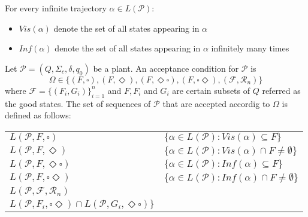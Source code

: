 \documentclass[table]{beamer}
\newcommand{\Plant}{\ensuremath{\mathcal{P}=(Q,\Sigma_c,\delta, q_0)}}
\newcommand{\AccpCond}{\ensuremath{\{(F,\square),(F,\Diamond ),(F,\Diamond\square),(F,\square\Diamond),(\mathcal{F},\mathcal{R}_n)\}}}
\begin{document}
\begin{frame}
	For every infinite trajectory $\alpha \in L(\mathcal{P})$:
	\begin{itemize}
		\item $Vis(\alpha)$ denote the set of all states appearing in $\alpha$
		\item $Inf(\alpha)$ denote the set of all states appearing in $\alpha$ infinitely many times
	\end{itemize}
\end{frame}

\begin{frame}
	\begin{dfn}
		Let $\Plant$ be a plant. An acceptance condition for $\mathcal{P}$ is
		$$ \Omega \in \AccpCond$$
		where $\mathcal{F} = \{(F_i,G_i)\}^{n}_{i=1}$ and $F, F_i$ and $G_i$ 
		are certain subsets of $Q$ referred as the good states. The set of sequences of $\mathcal{P}$ that are accepted
		accordig to $\Omega$ is defined as follows:
	\end{dfn}
	\begin{adjustwidth}{-1cm}{-1cm}
	\begin{table}[]
		\begin{tabular}{ll}
		\hline
		\rowcolor{azzurro_chiaro}
		$L(\mathcal{P},F,\square)$ & $\{\alpha \in L(\mathcal{P}):Vis(\alpha)\subseteq F\}$ \\ 
		$L(\mathcal{P},F,\Diamond)$ & $\{\alpha \in L(\mathcal{P}):Vis(\alpha)\cap F \neq \emptyset\}$ \\ 
		\rowcolor{azzurro_chiaro}
		$L(\mathcal{P},F,\Diamond\square)$ & $\{\alpha \in L(\mathcal{P}):Inf(\alpha)\subseteq F\}$ \\ 
		$L(\mathcal{P},F,\square\Diamond)$ & $\{\alpha \in L(\mathcal{P}):Inf(\alpha)\cap F \neq \emptyset\}$\\ 
		\rowcolor{azzurro_chiaro}
		$L(\mathcal{P},\mathcal{F},\mathcal{R}_n)$ & \shortstack{
			$\{\alpha \in L(\mathcal{P}): \exists i \alpha \in$ \\
			$L(\mathcal{P},F_i,\square\Diamond) \cap L(\mathcal{P},G_i,\Diamond\square)\}$
		} \\ 
		\hline
		\end{tabular}
	\end{table}
	\end{adjustwidth}
\end{frame}
\end{document}
